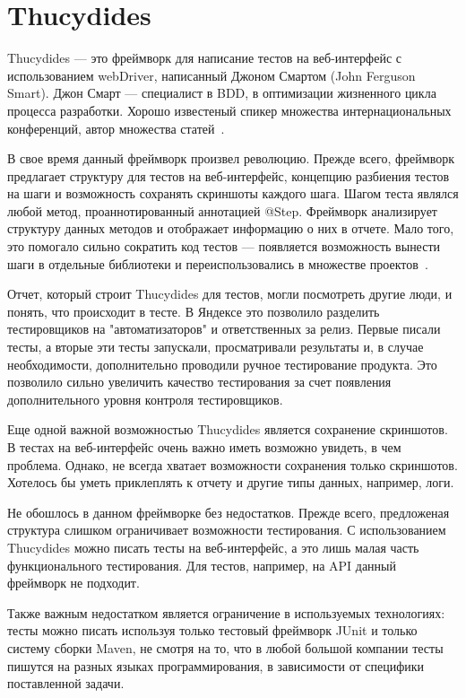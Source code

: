 \section{Thucydides}

Thucydides --- это фреймворк для написание тестов на веб-интерфейс с использованием webDriver, написанный Джоном Смартом (John Ferguson Smart). Джон Смарт --- специалист в BDD, в оптимизации жизненного цикла процесса разработки. Хорошо известеный спикер множества интернациональных конференций, автор множества статей~\cite{john_smart_home}.

В свое время данный фреймворк произвел революцию. Прежде всего, фреймворк предлагает структуру для тестов на веб-интерфейс, концепцию разбиения тестов на шаги и возможность сохранять скриншоты каждого шага. Шагом теста являлся любой метод, проаннотированный аннотацией @Step.
Фреймворк анализирует структуру данных методов и отображает информацию о них в отчете. Мало того, это помогало сильно сократить код тестов --- появляется возможность вынести шаги в отдельные библиотеки и переиспользовались в множестве проектов~\cite{thucydides_docs}.

Отчет, который строит Thucydides для тестов, могли посмотреть другие люди, и понять, что происходит в тесте. В Яндексе это позволило разделить тестировщиков на "автоматизаторов" и ответственных за релиз. Первые писали тесты, а вторые эти тесты запускали, просматривали результаты и, в случае необходимости, дополнительно проводили ручное тестирование продукта. Это позволило сильно увеличить качество тестирования за счет появления дополнительного уровня контроля тестировщиков.

Еще одной важной возможностью Thucydides является сохранение скриншотов. В тестах на веб-интерфейс очень важно иметь возможно увидеть, в чем проблема. Однако, не всегда хватает возможности сохранения только скриншотов. Хотелось бы уметь приклеплять к отчету и другие типы данных, например, логи.

Не обошлось в данном фреймворке без недостатков. Прежде всего, предложеная структура слишком ограничивает возможности тестирования. С использованием Thucydides можно писать тесты на веб-интерфейс, а это лишь малая часть функционального тестирования. Для тестов, например, на API данный фреймворк не подходит.

Также важным недостатком является ограничение в используемых технологиях: тесты можно писать используя только тестовый фреймворк JUnit и только систему сборки Maven, не смотря на то, что  в любой большой компании тесты пишутся на разных языках программирования, в зависимости от специфики поставленной задачи.  


